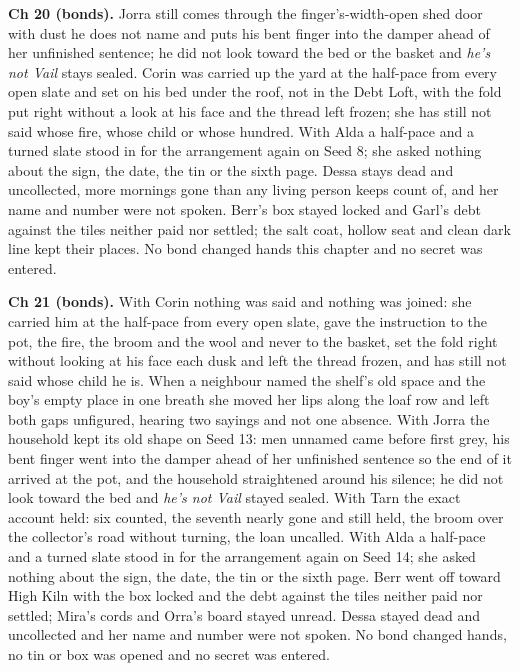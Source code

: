 \documentclass{design/chronicle}
\begin{document}
{\textbf{Ch 20 (bonds).} Jorra still comes through the finger’s-width-open shed door with dust he does not name and puts his bent finger into the damper ahead of her unfinished sentence; he did not look toward the bed or the basket and \emph{he’s not Vail} stays sealed. Corin was carried up the yard at the half-pace from every open slate and set on his bed under the roof, not in the Debt Loft, with the fold put right without a look at his face and the thread left frozen; she has still not said whose fire, whose child or whose hundred. With Alda a half-pace and a turned slate stood in for the arrangement again on Seed 8; she asked nothing about the sign, the date, the tin or the sixth page. Dessa stays dead and uncollected, more mornings gone than any living person keeps count of, and her name and number were not spoken. Berr’s box stayed locked and Garl’s debt against the tiles neither paid nor settled; the salt coat, hollow seat and clean dark line kept their places. No bond changed hands this chapter and no secret was entered.

\textbf{Ch 21 (bonds).} With Corin nothing was said and nothing was joined: she carried him at the half-pace from every open slate, gave the instruction to the pot, the fire, the broom and the wool and never to the basket, set the fold right without looking at his face each dusk and left the thread frozen, and has still not said whose child he is. When a neighbour named the shelf’s old space and the boy’s empty place in one breath she moved her lips along the loaf row and left both gaps unfigured, hearing two sayings and not one absence. With Jorra the household kept its old shape on Seed 13: men unnamed came before first grey, his bent finger went into the damper ahead of her unfinished sentence so the end of it arrived at the pot, and the household straightened around his silence; he did not look toward the bed and \emph{he’s not Vail} stayed sealed. With Tarn the exact account held: six counted, the seventh nearly gone and still held, the broom over the collector’s road without turning, the loan uncalled. With Alda a half-pace and a turned slate stood in for the arrangement again on Seed 14; she asked nothing about the sign, the date, the tin or the sixth page. Berr went off toward High Kiln with the box locked and the debt against the tiles neither paid nor settled; Mira’s cords and Orra’s board stayed unread. Dessa stayed dead and uncollected and her name and number were not spoken. No bond changed hands, no tin or box was opened and no secret was entered.

}
\end{document}
